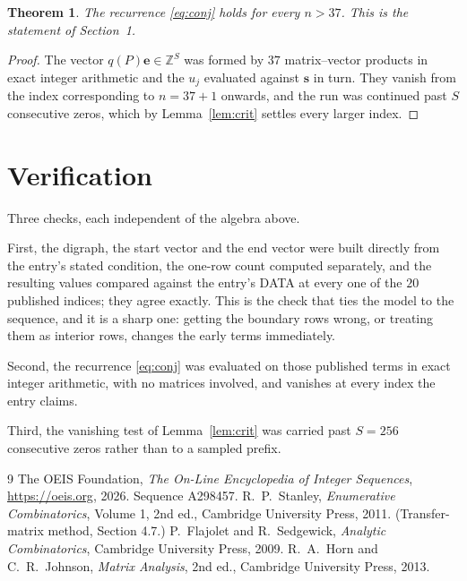 \documentclass[11pt,a4paper]{article}
\theoremstyle{plain}
\newtheorem{theorem}{Theorem}
\theoremstyle{definition}
\begin{document}
\begin{theorem}
The recurrence \eqref{eq:conj} holds for every $n>37$. This is the statement of
Section~1.
\end{theorem}

\begin{proof}
The vector $q(P)\mathbf{e}\in\mathbb{Z}^{S}$ was formed by $37$ matrix--vector
products in exact integer arithmetic and the $u_j$ evaluated against $\mathbf{s}$ in turn.
They vanish from the index corresponding to $n=37+1$ onwards, and the run was continued
past $S$ consecutive zeros, which by Lemma~\ref{lem:crit} settles every larger index.
\end{proof}

\section{Verification}

Three checks, each independent of the algebra above.

First, the digraph, the start vector and the end vector were built directly from the
entry's stated condition, the one-row count computed separately, and the resulting values
compared against the entry's DATA at every one of the $20$ published indices; they
agree exactly. This is the check that ties the model to the sequence, and it is a sharp one:
getting the boundary rows wrong, or treating them as interior rows, changes the early terms
immediately.

Second, the recurrence \eqref{eq:conj} was evaluated on those published terms in exact
integer arithmetic, with no matrices involved, and vanishes at every index the entry claims.

Third, the vanishing test of Lemma~\ref{lem:crit} was carried past $S=256$ consecutive
zeros rather than to a sampled prefix.

\begin{thebibliography}{9}
 The OEIS Foundation, \emph{The On-Line Encyclopedia of Integer
Sequences}, \url{https://oeis.org}, 2026. Sequence A298457.
 R.~P.~Stanley, \emph{Enumerative Combinatorics}, Volume 1, 2nd ed.,
Cambridge University Press, 2011. (Transfer-matrix method, Section 4.7.)
 P.~Flajolet and R.~Sedgewick, \emph{Analytic Combinatorics}, Cambridge
University Press, 2009.
 R.~A.~Horn and C.~R.~Johnson, \emph{Matrix Analysis}, 2nd ed., Cambridge
University Press, 2013.
\end{thebibliography}
\end{document}
